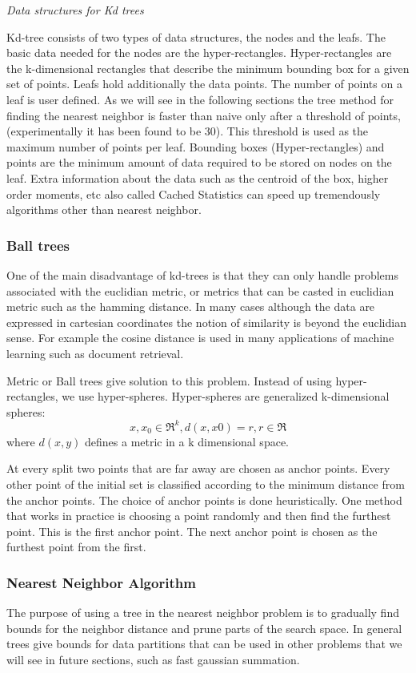 \documentclass[12pt,letterpaper,doublespaced,ETD,dvips,proposal]{gtthesis}
\begin{document}
\begin{Body}
\emph{Data structures for Kd trees}

 Kd-tree consists of two types of data structures, the nodes and the
 leafs. The basic data needed for the nodes are the
 hyper-rectangles. Hyper-rectangles are the k-dimensional rectangles
 that describe the minimum bounding box  for a given set of points.
 Leafs hold additionally the data points. The number of points on a
 leaf is user defined. As we will see in the following sections the
 tree method for finding the nearest neighbor is faster than naive
 only after a threshold of points, (experimentally it has been found
 to be 30). This threshold is used as the maximum number of points
 per leaf. Bounding boxes (Hyper-rectangles) and points are the minimum amount
 of data required to be stored on nodes on the leaf. Extra
 information about the data such as the centroid of the box, higher
 order moments, etc also called Cached Statistics can speed up
 tremendously algorithms other than nearest neighbor.


\subsubsection{Ball trees}
One of the main disadvantage of kd-trees is that they can only
handle problems associated with the euclidian metric, or metrics
that can be casted in euclidian metric such as the hamming distance.
In many cases although the data are expressed in cartesian
coordinates the notion of similarity is beyond the euclidian sense.
For example the cosine distance is used in many applications of
machine learning such as document retrieval.

Metric or Ball trees give solution to this problem. Instead of using
hyper-rectangles, we use hyper-spheres. Hyper-spheres are
generalized k-dimensional spheres:
\begin{equation}
x,x_0 \in \Re^k , d(x,x0)=r, r\in \Re
\end{equation}
where $d(x, y)$ defines a metric in a k dimensional space.

At every split two points that are far away are chosen as anchor
points. Every other point of the initial set is classified according
to the minimum distance from the anchor points. The choice of anchor
points is done heuristically. One method that works in practice is
choosing a point randomly and then find the furthest point. This is
the first anchor point. The next anchor point is chosen as the
furthest point from the first.
\subsubsection{Nearest Neighbor Algorithm}
The purpose of using a tree in the nearest neighbor problem is to
gradually find bounds for the neighbor distance and prune parts of
the search space. In general trees give bounds for data partitions
that can be used in other problems that we will see in future
sections, such as fast gaussian summation.


\end{Body}
\end{document}
